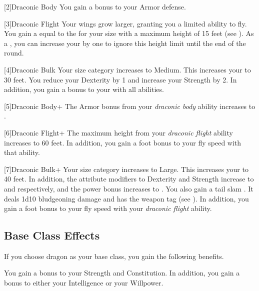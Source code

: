     [2]{Draconic Body} You gain a  bonus to your Armor defense.

      [3]{Draconic Flight} Your wings grow larger, granting you a limited ability to fly.
      You gain a  equal to the  for your size with a maximum height of 15 feet (see ).
      As a , you can increase your  by one to ignore this height limit until the end of the round.

    [4]{Draconic Bulk} Your size category increases to Medium.
      This increases your  to 30 feet.
      You reduce your Dexterity by 1 and increase your Strength by 2.
      In addition, you gain a  bonus to your  with all abilities.

    [5]{Draconic Body+} The Armor bonus from your \textit{draconic body} ability increases to .

      [6]{Draconic Flight+} The maximum height from your \textit{draconic flight} ability increases to 60 feet.
      In addition, you gain a  foot bonus to your fly speed with that ability.

    [7]{Draconic Bulk+} Your size category increases to Large.
      This increases your  to 40 feet.
      In addition, the attribute modifiers to Dexterity and Strength increase to  and  respectively, and the power bonus increases to .
      You also gain a tail slam .
      It deals 1d10 bludgeoning damage and has the  weapon tag (see ).
      In addition, you gain a  foot bonus to your fly speed with your \textit{draconic flight} ability.

  \subsection{Base Class Effects}
    If you choose dragon as your base class, you gain the following benefits.

     You gain a  bonus to your Strength and Constitution. In addition, you gain a  bonus to either your Intelligence or your Willpower.

